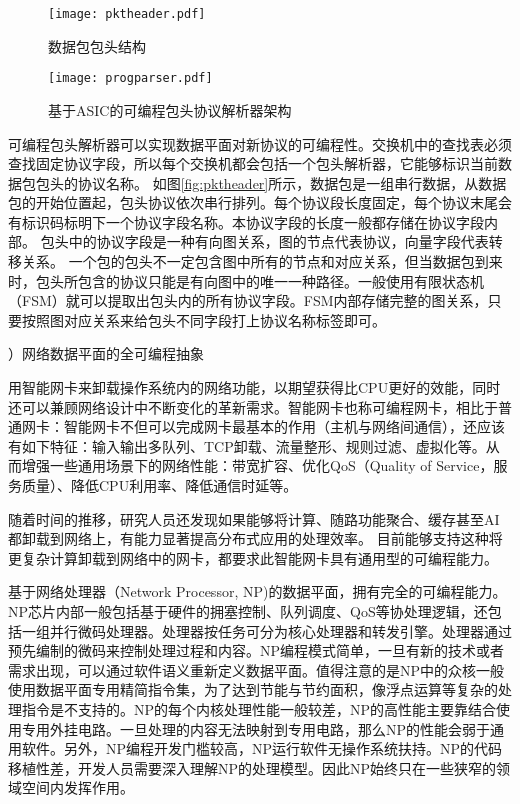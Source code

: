 \begin{figure}[htbp]
	\centering 
	\vspace{-1.5mm}
	\begin{minipage}[t]{0.48\textwidth}
		\centering
		\texttt{[image: pktheader.pdf]}
		\caption{数据包包头结构} \label{fig:pktheader}
	\end{minipage}
	\begin{minipage}[t]{0.48\textwidth}
		\centering
		\texttt{[image: progparser.pdf]}
		\caption{基于ASIC的可编程包头协议解析器架构} \label{fig:progparser}
	\end{minipage}
\end{figure}



可编程包头解析器可以实现数据平面对新协议的可编程性。交换机中的查找表必须查找固定协议字段，所以每个交换机都会包括一个包头解析器，它能够标识当前数据包包头的协议名称。
如图\ref{fig:pktheader}所示，数据包是一组串行数据，从数据包的开始位置起，包头协议依次串行排列。每个协议段长度固定，每个协议末尾会有标识码标明下一个协议字段名称。本协议字段的长度一般都存储在协议字段内部。
包头中的协议字段是一种有向图关系，图的节点代表协议，向量字段代表转移关系。
一个包的包头不一定包含图中所有的节点和对应关系，但当数据包到来时，包头所包含的协议只能是有向图中的唯一一种路径。一般使用有限状态机（FSM）就可以提取出包头内的所有协议字段。FSM内部存储完整的图关系，只要按照图对应关系来给包头不同字段打上协议名称标签即可。


\label{chap123}


{）网络数据平面的全可编程抽象}


用智能网卡来卸载操作系统内的网络功能，以期望获得比CPU更好的效能，同时还可以兼顾网络设计中不断变化的革新需求。智能网卡也称可编程网卡，相比于普通网卡：智能网卡不但可以完成网卡最基本的作用（主机与网络间通信），还应该有如下特征：输入输出多队列、TCP卸载、流量整形、规则过滤、虚拟化等。从而增强一些通用场景下的网络性能：带宽扩容、优化QoS（Quality of Service，服务质量）、降低CPU利用率、降低通信时延等。

随着时间的推移，研究人员还发现如果能够将计算、随路功能聚合、缓存甚至AI都卸载到网络上，有能力显著提高分布式应用的处理效率。
目前能够支持这种将更复杂计算卸载到网络中的网卡，都要求此智能网卡具有通用型的可编程能力。

基于网络处理器（Network Processor, NP)的数据平面，拥有完全的可编程能力。NP芯片内部一般包括基于硬件的拥塞控制、队列调度、QoS等协处理逻辑，还包括一组并行微码处理器。处理器按任务可分为核心处理器和转发引擎。处理器通过预先编制的微码来控制处理过程和内容。NP编程模式简单，一旦有新的技术或者需求出现，可以通过软件语义重新定义数据平面。值得注意的是NP中的众核一般使用数据平面专用精简指令集，为了达到节能与节约面积，像浮点运算等复杂的处理指令是不支持的。NP的每个内核处理性能一般较差，NP的高性能主要靠结合使用专用外挂电路。一旦处理的内容无法映射到专用电路，那么NP的性能会弱于通用软件。另外，NP编程开发门槛较高，NP运行软件无操作系统扶持。NP的代码移植性差，开发人员需要深入理解NP的处理模型。因此NP始终只在一些狭窄的领域空间内发挥作用。



